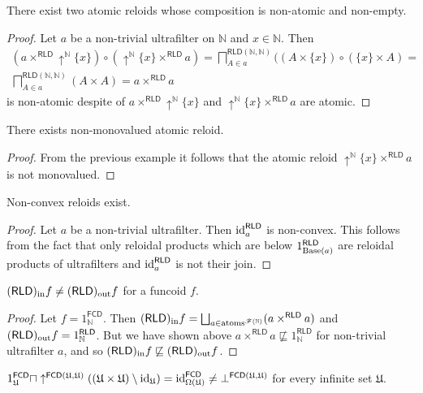 \begin{example}
There exist two atomic reloids whose composition is non-atomic and
non-empty.\end{example}
\begin{proof}
Let $a$ be a non-trivial ultrafilter on $\mathbb{N}$ and $x\in\mathbb{N}$.
Then
\begin{multline*}
(a\times^{\mathsf{RLD}}\uparrow^{\mathbb{N}}\{x\})\circ(\uparrow^{\mathbb{N}}\{x\}\times^{\mathsf{RLD}}a)=\bigsqcap_{A\in a}^{\mathsf{RLD}(\mathbb{N},\mathbb{N})}((A\times\{x\})\circ(\{x\}\times A)=\\
\bigsqcap_{A\in a}^{\mathsf{RLD}(\mathbb{N},\mathbb{N})}(A\times A)=a\times^{\mathsf{RLD}}a
\end{multline*}
is non-atomic despite of $a\times^{\mathsf{RLD}}\uparrow^{\mathbb{N}}\{x\}$
and $\uparrow^{\mathbb{N}}\{x\}\times^{\mathsf{RLD}}a$ are atomic.\end{proof}
\begin{example}
There exists non-monovalued atomic reloid.\end{example}
\begin{proof}
From the previous example it follows that the atomic reloid $\uparrow^{\mathbb{N}}\{x\}\times^{\mathsf{RLD}}a$
is not monovalued.\end{proof}
\begin{example}
Non-convex reloids exist.\end{example}
\begin{proof}
Let $a$ be a non-trivial ultrafilter. Then $\operatorname{id}_{a}^{\mathsf{RLD}}$
is non-convex. This follows from the fact that only reloidal products
which are below $1_{\operatorname{Base}(a)}^{\mathsf{RLD}}$ are reloidal products
of ultrafilters and $\operatorname{id}_{a}^{\mathsf{RLD}}$ is not their join.\end{proof}
\begin{example}
$(\mathsf{RLD})_{\mathrm{in}} f\ne(\mathsf{RLD})_{\mathrm{out}} f$ for a funcoid $f$.\end{example}
\begin{proof}
Let $f=1_{\mathbb{N}}^{\mathsf{FCD}}$. Then $\torldin f=\bigsqcup_{a\in\atoms^{\mathscr{F}(\mathbb{N})}}(a\times^{\mathsf{RLD}}a)$
and $(\mathsf{RLD})_{\mathrm{out}} f=1_{\mathbb{N}}^{\mathsf{RLD}}$. But we have shown
above $a\times^{\mathsf{RLD}}a\nsqsubseteq1_{\mathbb{N}}^{\mathsf{RLD}}$
for non-trivial ultrafilter $a$, and so $(\mathsf{RLD})_{\mathrm{in}} f\not\sqsubseteq(\mathsf{RLD})_{\mathrm{out}} f$.\end{proof}
\begin{prop}
\label{fcd-meet-frechet}$1_{\mathfrak{U}}^{\mathsf{FCD}}\sqcap\uparrow^{\mathsf{FCD}(\mathfrak{U},\mathfrak{U})}((\mathfrak{U}\times\mathfrak{U})\setminus\operatorname{id}_{\mathfrak{U}})=\operatorname{id}_{\Omega(\mathfrak{U})}^{\mathsf{FCD}}\ne\bot^{\mathsf{FCD}(\mathfrak{U},\mathfrak{U})}$
for every infinite set $\mathfrak{U}$.\end{prop}
